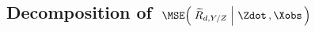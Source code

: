 

\clearpage
\subsection{Decomposition of \,$\MSE\!\left(\,\left.\widetilde{R}_{d,Y/Z}\;\right\vert\,\Zdot\,,\Xobs\,\right)$}
\setcounter{theorem}{0}


